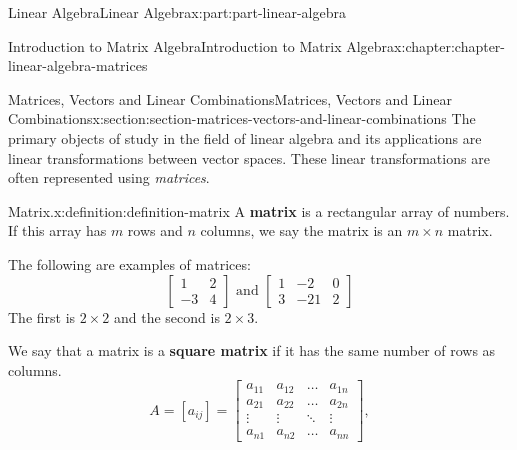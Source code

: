 \documentclass[twoside,10pt,]{book}
\newcommand{\terminology}[1]{\textbf{#1}}
\numberwithin{equation}{part}
\begin{document}
\begin{partptx}{Linear Algebra}{}{Linear Algebra}{}{}{x:part:part-linear-algebra}
%
\typeout{************************************************}
\typeout{************************************************}
%
\begin{chapterptx}{Introduction to Matrix Algebra}{}{Introduction to Matrix Algebra}{}{}{x:chapter:chapter-linear-algebra-matrices}
%
%
\typeout{************************************************}
\typeout{************************************************}
%
\begin{sectionptx}{Matrices, Vectors and Linear Combinations}{}{Matrices, Vectors and Linear Combinations}{}{}{x:section:section-matrices-vectors-and-linear-combinations}
The primary objects of study in the field of linear algebra and its applications are linear transformations between vector spaces. These linear transformations are often represented using \emph{matrices}.%
\begin{definition}{Matrix.}{x:definition:definition-matrix}%
%
A \terminology{matrix} is a rectangular array of numbers. If this array has \(m\) rows and \(n\) columns, we say the matrix is an \(m\times n\) matrix.%
\end{definition}
The following are examples of matrices:%
\begin{equation*}
\begin{bmatrix} 1 & 2 \\ -3 & 4 \end{bmatrix}\text{ and }\begin{bmatrix}1 & -2 & 0 \\ 3 & -21 & 2\end{bmatrix}
\end{equation*}
The first is \(2\times2\) and the second is \(2\times3\).%
\par
We say that a matrix is a \terminology{square matrix} if it has the same number of rows as columns.%
\begin{equation*}
A = [a_{ij}] = \begin{bmatrix}
a_{11} & a_{12} & \dots & a_{1n} \\
a_{21} & a_{22} & \dots & a_{2n} \\
\vdots & \vdots & \ddots & \vdots \\
a_{n1} & a_{n2} & \dots & a_{nn}
\end{bmatrix},
\end{equation*}

\end{sectionptx}
\end{chapterptx}
\end{partptx}
\end{document}
